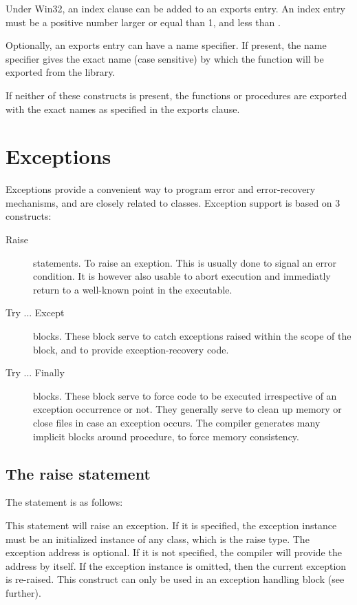 Under Win32, an index clause can be added to an exports entry.
An index entry must be a positive number larger or equal than 1, and less
than .

Optionally, an exports entry can have a name specifier. If present, the name
specifier gives the exact name (case sensitive) by which the function will
be exported from the library.

If neither of these constructs is present, the functions or procedures
are exported with the exact names as specified in the exports clause.

\chapter{Exceptions}
\label{ch:Exceptions}
Exceptions provide a convenient way to program error and error-recovery
mechanisms, and are closely related to classes.
Exception support is based on 3 constructs:
\begin{description}
\item [Raise\ ] statements. To raise an exeption. This is usually done to signal an
error condition. It is however also usable to
abort execution and immediatly return to a well-known point in the
executable.
\item [Try ... Except\ ] blocks. These block serve to catch exceptions
raised within the scope of the block, and to provide exception-recovery
code.
\item [Try ... Finally\ ] blocks. These block serve to force code to be
executed irrespective of an exception occurrence or not. They generally
serve to clean up memory or close files in case an exception occurs.
The compiler generates many implicit  blocks around
procedure, to force memory consistency.
\end{description}


\section{The raise statement}
The  statement is as follows:

This statement will raise an exception. If it is specified, the exception
instance must be an initialized instance of any class, which is the raise
type. The exception address is optional. If it is not specified, the compiler
will provide the address by itself. If the exception instance is omitted, 
then the current exception is re-raised. This construct can only be used 
in an exception handling block (see further).


